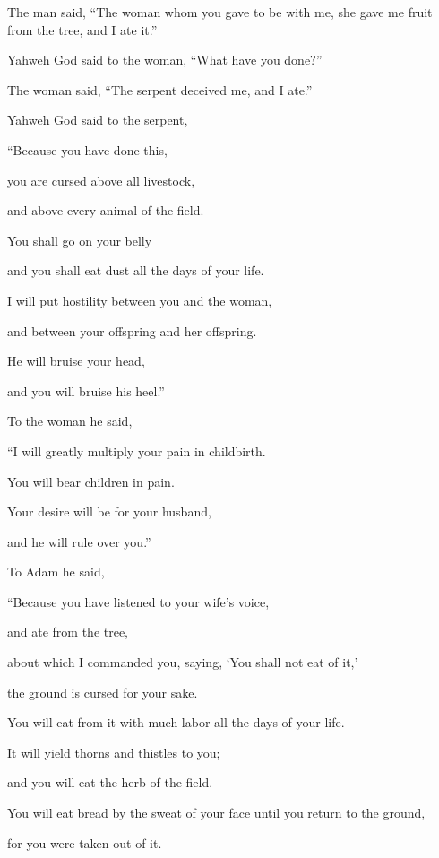 {\par }{\PP {}The man said, “The woman whom you gave to be with me, she gave me fruit from the tree, and I ate it.”
\par }{\PP {}Yahweh God said to the woman, “What have you done?”
\par }{\PP The woman said, “The serpent deceived me, and I ate.”
\par }{\PP {}Yahweh God said to the serpent,
\par }{\Q “Because you have done this,
\par }{\QB you are cursed above all livestock,
\par }{\QB and above every animal of the field.
\par }{\Q You shall go on your belly
\par }{\QB and you shall eat dust all the days of your life.
\par }{\Q {}I will put hostility between you and the woman,
\par }{\QB and between your offspring and her offspring.
\par }{\Q He will bruise your head,
\par }{\QB and you will bruise his heel.”
\par }{\PP {}To the woman he said,
\par }{\Q “I will greatly multiply your pain in childbirth.
\par }{\QB You will bear children in pain.
\par }{\Q Your desire will be for your husband,
\par }{\QB and he will rule over you.”
\par }{\PP {}To Adam he said,
\par }{\Q “Because you have listened to your wife’s voice,
\par }{\QB and ate from the tree,
\par }{\QB about which I commanded you, saying, ‘You shall not eat of it,’
\par }{\QB the ground is cursed for your sake.
\par }{\Q You will eat from it with much labor all the days of your life.
\par }{\QB {}It will yield thorns and thistles to you;
\par }{\QB and you will eat the herb of the field.
\par }{\Q {}You will eat bread by the sweat of your face until you return to the ground,
\par }{\QB for you were taken out of it.
}
